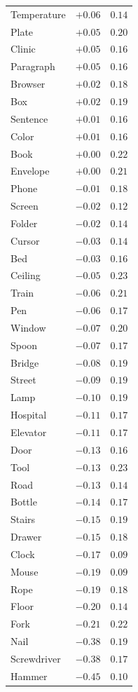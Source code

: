 \documentclass[11pt, letterpaper]{article}
\begin{document}
\begin{longtable}{lcc}
  Temperature & $+0.06$ & $0.14$ \\
  Plate & $+0.05$ & $0.20$ \\
  Clinic & $+0.05$ & $0.16$ \\
  Paragraph & $+0.05$ & $0.16$ \\
  Browser & $+0.02$ & $0.18$ \\
  Box & $+0.02$ & $0.19$ \\
  Sentence & $+0.01$ & $0.16$ \\
  Color & $+0.01$ & $0.16$ \\
  Book & $+0.00$ & $0.22$ \\
  Envelope & $+0.00$ & $0.21$ \\
  Phone & $-0.01$ & $0.18$ \\
  Screen & $-0.02$ & $0.12$ \\
  Folder & $-0.02$ & $0.14$ \\
  Cursor & $-0.03$ & $0.14$ \\
  Bed & $-0.03$ & $0.16$ \\
  Ceiling & $-0.05$ & $0.23$ \\
  Train & $-0.06$ & $0.21$ \\
  Pen & $-0.06$ & $0.17$ \\
  Window & $-0.07$ & $0.20$ \\
  Spoon & $-0.07$ & $0.17$ \\
  Bridge & $-0.08$ & $0.19$ \\
  Street & $-0.09$ & $0.19$ \\
  Lamp & $-0.10$ & $0.19$ \\
  Hospital & $-0.11$ & $0.17$ \\
  Elevator & $-0.11$ & $0.17$ \\
  Door & $-0.13$ & $0.16$ \\
  Tool & $-0.13$ & $0.23$ \\
  Road & $-0.13$ & $0.14$ \\
  Bottle & $-0.14$ & $0.17$ \\
  Stairs & $-0.15$ & $0.19$ \\
  Drawer & $-0.15$ & $0.18$ \\
  Clock & $-0.17$ & $0.09$ \\
  Mouse & $-0.19$ & $0.09$ \\
  Rope & $-0.19$ & $0.18$ \\
  Floor & $-0.20$ & $0.14$ \\
  Fork & $-0.21$ & $0.22$ \\
  Nail & $-0.38$ & $0.19$ \\
  Screwdriver & $-0.38$ & $0.17$ \\
  Hammer & $-0.45$ & $0.10$ \\
\end{longtable}
\end{document}
